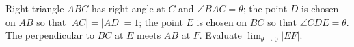 Right triangle $ABC$ has right angle at $C$ and $\angle BAC =\theta$;
the point $D$ is chosen on $AB$ so that $|AC|=|AD|=1$; the point $E$
is chosen on $BC$ so that $\angle CDE = \theta$.  The perpendicular
to $BC$ at $E$ meets $AB$ at $F$.  Evaluate $\lim_{\theta\rightarrow 0}
|EF|$.
